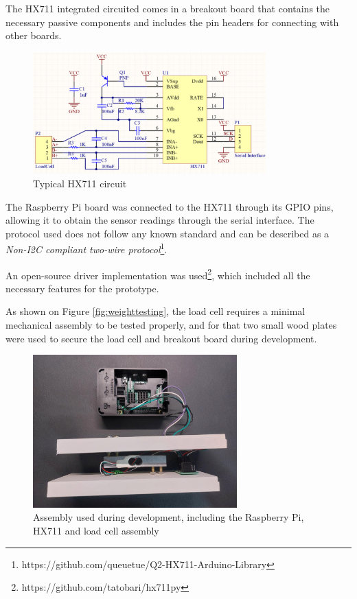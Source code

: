 \documentclass[openright]{normas-utf-tex} %
\begin{document}
The HX711 integrated circuited comes in a breakout board that contains the necessary passive components
and includes the pin headers for connecting with other boards.

\begin{figure}[H]
	\centering
	\includegraphics[width=0.8\textwidth]{./images/hx711circuit.png}
	\caption[Typical HX711 circuit]{Typical HX711 circuit}
\end{figure}

The Raspberry Pi board was connected to the HX711 through its GPIO pins,
allowing it to obtain the sensor readings through the serial interface. The
protocol used does not follow any known standard and can be
described as a \textit{Non-I2C compliant two-wire
protocol}\footnote{https://github.com/queuetue/Q2-HX711-Arduino-Library}.

An open-source driver implementation was used\footnote{https://github.com/tatobari/hx711py}, 
which included all the necessary features for the prototype.

As shown on Figure \ref{fig:weighttesting}, the load cell requires a minimal
mechanical assembly to be tested properly, and for that two small wood plates
were used to secure the load cell and breakout board during development.

\begin{figure}[H]
	\centering
	\includegraphics[width=0.7\textwidth]{./images/raspberrypiwithloadcell.jpeg}
    \caption[Assembly used during development, including the Raspberry Pi, HX711 and load cell assembly]{Assembly used during development, including the Raspberry Pi, HX711 and load cell assembly}
	\label{fig:dummy}
\end{figure}
\end{document}
